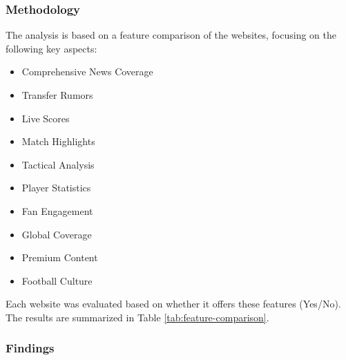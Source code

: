 \subsubsection{Methodology}
The analysis is based on a feature comparison of the websites, focusing on the following key aspects:
\begin{itemize}
    \item Comprehensive News Coverage
    \item Transfer Rumors
    \item Live Scores
    \item Match Highlights
    \item Tactical Analysis
    \item Player Statistics
    \item Fan Engagement
    \item Global Coverage
    \item Premium Content
    \item Football Culture
\end{itemize}

Each website was evaluated based on whether it offers these features (Yes/No). The results are summarized in Table \ref{tab:feature-comparison}.

\subsubsection{Findings}

